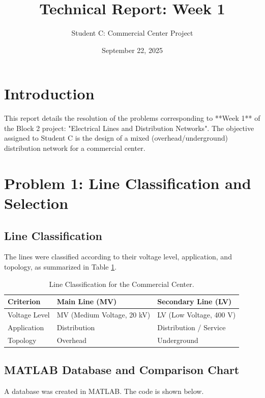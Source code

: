 \documentclass[12pt, a4paper]{article}
\title{\textbf{Technical Report: Week 1}}
\author{Student C: Commercial Center Project}
\date{September 22, 2025}
\begin{document}
\maketitle

\newpage
\tableofcontents
\newpage

\section{Introduction}

This report details the resolution of the problems corresponding to **Week 1** of the Block 2 project: "Electrical Lines and Distribution Networks". The objective assigned to Student C is the design of a mixed (overhead/underground) distribution network for a commercial center.

\section{Problem 1: Line Classification and Selection}

\subsection{Line Classification}
The lines were classified according to their voltage level, application, and topology, as summarized in Table \ref{tab:classification}.

\begin{table}[htbp]
    \centering
    \caption{Line Classification for the Commercial Center.}
    \label{tab:classification}
    \begin{tabular}{|l|l|l|}
        \hline
        \textbf{Criterion} & \textbf{Main Line (MV)} & \textbf{Secondary Line (LV)} \\ \hline
        Voltage Level & MV (Medium Voltage, 20 kV) & LV (Low Voltage, 400 V) \\
        Application & Distribution & Distribution / Service \\
        Topology & Overhead & Underground \\ \hline
    \end{tabular}
\end{table}

\subsection{MATLAB Database and Comparison Chart}
A database was created in MATLAB. The code is shown below.
\end{document}
